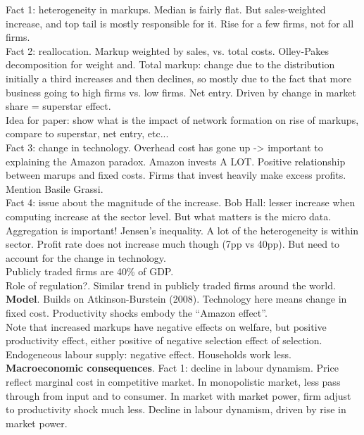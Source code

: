 \documentclass{amsart}
\theoremstyle{definition}
\theoremstyle{remark}
\numberwithin{equation}{section}
\begin{document}
Fact 1: heterogeneity in markups. Median is fairly flat. But sales-weighted increase, and top tail is mostly responsible for it. Rise for a few firms, not for all firms.\\

Fact 2: reallocation. Markup weighted by sales, vs. total costs. Olley-Pakes decomposition for weight and. Total markup: change due to the distribution initially a third increases and then declines, so mostly due to the fact that more business going to high firms vs. low firms. Net entry. Driven by change in market share = superstar effect. \\

Idea for paper: show what is the impact of network formation on rise of markups, compare to superstar, net entry, etc...\\

Fact 3: change in technology. Overhead cost has gone up -> important to explaining the Amazon paradox. Amazon invests A LOT. Positive relationship between marups and fixed costs. Firms that invest heavily make excess profits.\\

Mention Basile Grassi.\\

Fact 4: issue about the magnitude of the increase. Bob Hall: lesser increase when computing increase at the sector level. But what matters is the micro data. Aggregation is important! Jensen's inequality. A lot of the heterogeneity is within sector. Profit rate does not increase much though (7pp vs 40pp). But need to account for the change in technology.\\

Publicly traded firms are 40\% of GDP.\\

Role of regulation?. Similar trend in publicly traded firms around the world. \\

\textbf{Model}. Builds on Atkinson-Burstein (2008). Technology here means change in fixed cost. Productivity shocks embody the ``Amazon effect''.\\

Note that increased markups have negative effects on welfare, but positive productivity effect, either positive of negative selection effect of selection. Endogeneous labour supply: negative effect. Households work less.\\

\textbf{Macroeconomic consequences}. Fact 1: decline in labour dynamism. Price reflect marginal cost in competitive market. In monopolistic market, less pass through from input and to consumer. In market with market power, firm adjust to productivity shock much less. Decline in labour dynamism, driven by rise in market power.\\
\end{document}

